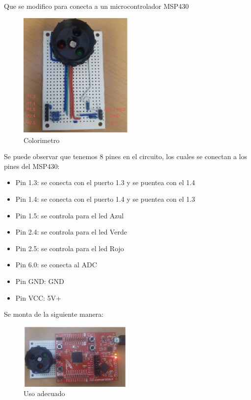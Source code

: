 \documentclass[12pt]{report}
\begin{document}
  Que se modifico para conecta a un microcontrolador MSP430
  \begin{figure}[H]
    \centering
    \includegraphics[width=0.5\textwidth]{circuito_MSP.png}
    \caption{Colorimetro}
    \label{fig:colorimetro}
  \end{figure}
  Se puede observar que tenemos 8 pines en el circuito, los cuales se conectan a los pines del MSP430:
  \begin{itemize}
    \item Pin 1.3: se conecta con el puerto 1.3 y se puentea con el 1.4
    \item Pin 1.4: se conecta con el puerto 1.4 y se puentea con el 1.3
    \item Pin 1.5: se controla para el led Azul
    \item Pin 2.4: se controla para el led Verde
    \item Pin 2.5: se controla para el led Rojo
    \item Pin 6.0: se conecta al ADC
    \item Pin GND: GND
    \item Pin VCC: 5V+
  \end{itemize}
Se monta de la siguiente manera:
\begin{figure}[H]
  \centering
  \includegraphics[width=0.5\textwidth]{uso_adecuado.png}
  \caption{Uso adecuado}
  \label{fig:uso_adecuado}
\end{figure}
\end{document}
